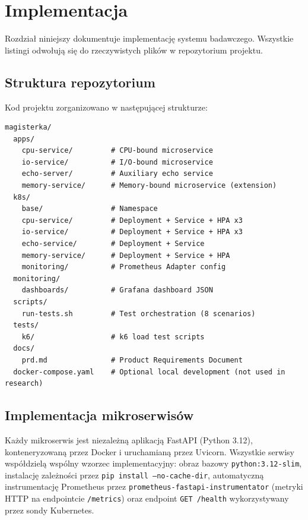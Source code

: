 \chapter{Implementacja}

Rozdział niniejszy dokumentuje implementację systemu badawczego. Wszystkie listingi odwołują się do rzeczywistych plików w repozytorium projektu.

\section{Struktura repozytorium}

Kod projektu zorganizowano w następującej strukturze:

\begin{verbatim}
magisterka/
  apps/
    cpu-service/         # CPU-bound microservice
    io-service/          # I/O-bound microservice
    echo-server/         # Auxiliary echo service
    memory-service/      # Memory-bound microservice (extension)
  k8s/
    base/                # Namespace
    cpu-service/         # Deployment + Service + HPA x3
    io-service/          # Deployment + Service + HPA x3
    echo-service/        # Deployment + Service
    memory-service/      # Deployment + Service + HPA
    monitoring/          # Prometheus Adapter config
  monitoring/
    dashboards/          # Grafana dashboard JSON
  scripts/
    run-tests.sh         # Test orchestration (8 scenarios)
  tests/
    k6/                  # k6 load test scripts
  docs/
    prd.md               # Product Requirements Document
  docker-compose.yaml    # Optional local development (not used in research)
\end{verbatim}

\section{Implementacja mikroserwisów}

Każdy mikroserwis jest niezależną aplikacją FastAPI (Python 3.12), konteneryzowaną przez Docker i uruchamianą przez Uvicorn. Wszystkie serwisy współdzielą wspólny wzorzec implementacyjny: obraz bazowy \texttt{python:3.12-slim}, instalację zależności przez \texttt{pip install --no-cache-dir}, automatyczną instrumentację Prometheus przez \texttt{prometheus-fastapi-instrumentator} (metryki HTTP na endpointcie \texttt{/metrics}) oraz endpoint \texttt{GET /health} wykorzystywany przez sondy Kubernetes.

